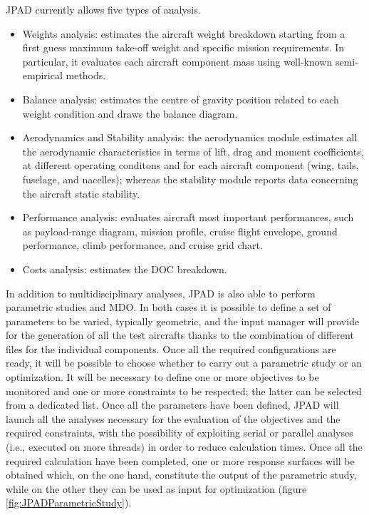 \bigskip
\noindent
\gls{JPAD} currently allows five types of analysis.
%
\begin{itemize}
\item Weights analysis: estimates the aircraft weight breakdown starting from a first guess maximum take-off weight and specific mission requirements. In particular, it evaluates each aircraft component mass using well-known semi-empirical methods.
\item Balance analysis: estimates the centre of gravity position related to each weight condition and draws the balance diagram.
\item Aerodynamics and Stability analysis: the aerodynamics module estimates all the aerodynamic characteristics in terms of lift, drag and moment coefficients, at different operating conditons and for each aircraft component (wing, tails, fuselage, and nacelles); whereas the stability module reports data concerning the aircraft static stability.
\item Performance analysis: evaluates aircraft most important performances, such as payload-range diagram, mission profile, cruise flight envelope, ground performance, climb performance, and cruise grid chart.
\item Costs analysis: estimates the \gls{DOC} breakdown.
\end{itemize}
%
In addition to multidisciplinary analyses, \gls{JPAD} is also able to perform parametric studies and \gls{MDO}. In both cases it is possible to define a set of parameters to be varied, typically geometric, and the input manager will provide for the generation of all the test aircrafts thanks to the combination of different files for the individual components. Once all the required configurations are ready, it will be possible to choose whether to carry out a parametric study or an optimization. It will be necessary to define one or more objectives to be monitored and one or more constraints to be respected; the latter can be selected from a dedicated list. Once all the parameters have been defined, \gls{JPAD} will launch all the analyses necessary for the evaluation of the objectives and the required constraints, with the possibility of exploiting serial or parallel analyses (i.e., executed on more threads) in order to reduce calculation times. Once all the required calculation have been completed, one or more response surfaces will be obtained which, on the one hand, constitute the output of the parametric study, while on the other they can be used as input for optimization (figure \ref{fig:JPADParametricStudy}). 
